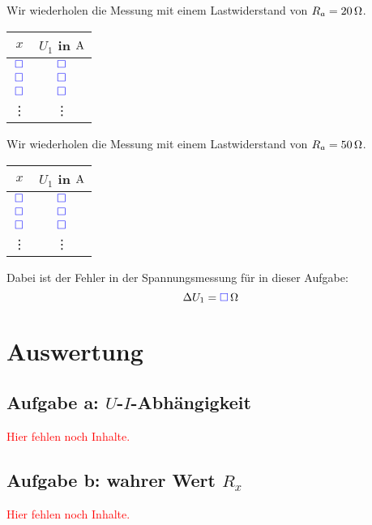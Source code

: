 \documentclass[11pt,german]{article}
\newcommand{\messwert}{\textcolor{blue}{\square}}
\newcommand{\fehlt}{\textcolor{red}{Hier fehlen noch Inhalte.}}
\begin{document}
Wir wiederholen die Messung mit einem Lastwiderstand von $R_a = \unit[20] \Omega$.

\begin{center}
	\begin{tabular}{cc}
		$x$ & $U_1$ in $\unit A$ \\
		\hline
		$\messwert$ & $\messwert$ \\
		$\messwert$ & $\messwert$ \\
		$\messwert$ & $\messwert$ \\
			 \vdots & \vdots
	\end{tabular}
\end{center}

Wir wiederholen die Messung mit einem Lastwiderstand von $R_a = \unit[50] \Omega$.

\begin{center}
	\begin{tabular}{cc}
		$x$ & $U_1$ in $\unit A$ \\
		\hline
		$\messwert$ & $\messwert$ \\
		$\messwert$ & $\messwert$ \\
		$\messwert$ & $\messwert$ \\
			 \vdots & \vdots
	\end{tabular}
\end{center}

Dabei ist der Fehler in der Spannungsmessung für in dieser Aufgabe:
\[ \Delta U_1 = \unit[\messwert] \Omega \]


\section{Auswertung}

\subsection{Aufgabe a: $U$-$I$-Abhängigkeit}

\fehlt

\subsection{Aufgabe b: wahrer Wert $R_x$}

\fehlt
\end{document}
